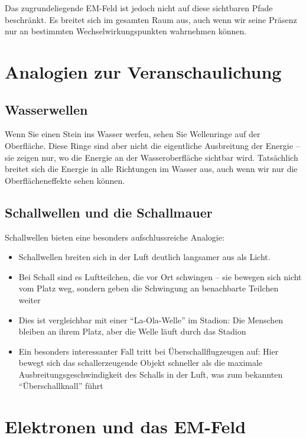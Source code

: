 \documentclass[12pt,a4paper]{article}
\begin{document}
	Das zugrundeliegende EM-Feld ist jedoch nicht auf diese sichtbaren Pfade beschränkt. Es breitet sich im gesamten Raum aus, auch wenn wir seine Präsenz nur an bestimmten Wechselwirkungspunkten wahrnehmen können.
	
	\section{Analogien zur Veranschaulichung}
	\subsection{Wasserwellen}
	Wenn Sie einen Stein ins Wasser werfen, sehen Sie Wellenringe auf der Oberfläche. Diese Ringe sind aber nicht die eigentliche Ausbreitung der Energie -- sie zeigen nur, wo die Energie an der Wasseroberfläche sichtbar wird. Tatsächlich breitet sich die Energie in alle Richtungen im Wasser aus, auch wenn wir nur die Oberflächeneffekte sehen können.
	
	\subsection{Schallwellen und die Schallmauer}
	Schallwellen bieten eine besonders aufschlussreiche Analogie:
	\begin{itemize}
		\item Schallwellen breiten sich in der Luft deutlich langsamer aus als Licht.
		\item Bei Schall sind es Luftteilchen, die vor Ort schwingen -- sie bewegen sich nicht vom Platz weg, sondern geben die Schwingung an benachbarte Teilchen weiter
		\item Dies ist vergleichbar mit einer ``La-Ola-Welle'' im Stadion: Die Menschen bleiben an ihrem Platz, aber die Welle läuft durch das Stadion
		\item Ein besonders interessanter Fall tritt bei Überschallflugzeugen auf: Hier bewegt sich das schallerzeugende Objekt schneller als die maximale Ausbreitungsgeschwindigkeit des Schalls in der Luft, was zum bekannten ``Überschallknall'' führt
	\end{itemize}
	
	\section{Elektronen und das EM-Feld}
\end{document}

